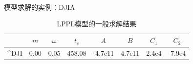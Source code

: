 \begin{frame}[t]{模型求解的实例：DJIA}
    \begin{figure}[H]
    \end{figure}
    \begin{table}[H]
        \begin{tabular}{@{}lccccccc@{}}
        \toprule
                               & $m$  & $\omega$ & $t_c$  & $A$              & $B$             & $C_1$      & $C_2$         \\ \midrule
        \textasciicircum{}DJI  & 0.00 & 0.05     & 458.08 & -4.7e11 & 4.7e11 & 2.4e4   & -7.9e4     \\ \bottomrule
        \end{tabular}
        \caption{LPPL模型的一般求解结果}\label{T:Solution-2}
    \end{table}
\end{frame}

